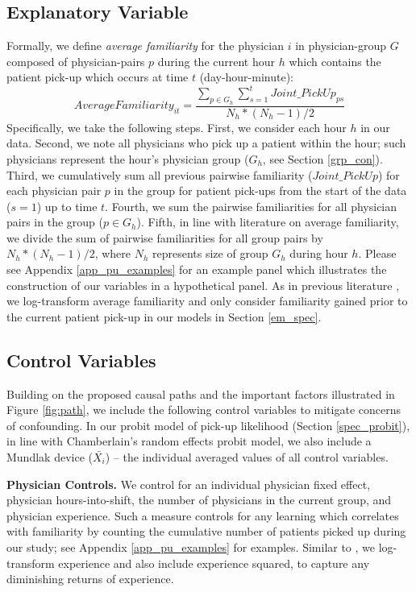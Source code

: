  \subsection{Explanatory Variable}
 Formally, we define \textit{average familiarity} for the physician $i$ in physician-group $G$ composed of physician-pairs $p$ during the current hour $h$ which contains the patient pick-up which occurs at time $t$ (day-hour-minute):
 \begin{equation} \label{eq_fam}
     AverageFamiliarity_{it} = \frac{ \sum_{p \in G_h} \sum_{s=1}^t Joint\_PickUp_{ps} }{ N_h * (N_h-1)/2 }
 \end{equation}
 \noindent 
 Specifically, we take the following steps. First, we consider each hour $h$ in our data. Second, we note all physicians who pick up a patient within the hour; such physicians represent the hour’s physician group ($G_h$, see Section \ref{grp_con}). Third, we cumulatively sum all previous pairwise familiarity ($Joint\_PickUp$) for each physician pair $p$ in the group for patient pick-ups from the start of the data ($s=1$) up to time $t$. Fourth, we sum the pairwise familiarities for all physician pairs in the group ($p \in G_h$). Fifth, in line with literature on average familiarity, we divide the sum of pairwise familiarities for all group pairs by $N_h*(N_h-1)/2$, where $N_h$ represents size of group $G_h$ during hour $h$. Please see Appendix \ref{app_pu_examples} for an example panel which illustrates the construction of our variables in a hypothetical panel. As in previous literature \citep[e.g.,][]{Avgerinos2017}, we log-transform average familiarity and only consider familiarity gained prior to the current patient pick-up in our models in Section \ref{em_spec}.

 \subsection{Control Variables} \label{ctrl_vars}
 Building on the proposed causal paths and the important factors illustrated in Figure \ref{fig:path}, we include the following control variables to mitigate concerns of confounding. In our probit model of pick-up likelihood (Section \ref{spec_probit}), in line with Chamberlain’s random effects probit model, we also include a Mundlak device ($\bar{X_i}$) – the individual averaged values of all control variables.
 
 \noindent \textbf{Physician Controls.} We control for an individual physician fixed effect, physician hours-into-shift, the number of physicians in the current group, and physician experience. Such a measure controls for any learning which correlates with familiarity by counting the cumulative number of patients picked up during our study; see Appendix \ref{app_pu_examples} for examples. Similar to \cite{Reagans2005}, we log-transform experience and also include experience squared, to capture any diminishing returns of experience. 
 
